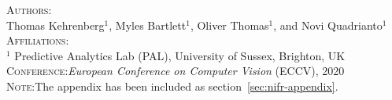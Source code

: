 


% 

% 




\textsc{Authors}:\\
Thomas Kehrenberg$^1$, Myles Bartlett$^1$, Oliver Thomas$^1$, and Novi Quadrianto$^1$ \\
\textsc{Affiliations}:\\
$^1$ Predictive Analytics Lab (PAL), University of Sussex, Brighton, UK\\
\textsc{Conference}:\;\;\textit{European Conference on Computer Vision} (ECCV), 2020 \\
\textsc{Note}:\;\;The appendix has been included as section~\ref{sec:nifr-appendix}.

